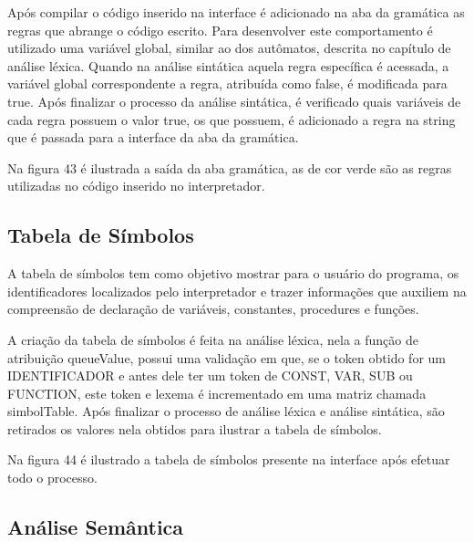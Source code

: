 \documentclass[12pt,oneside,a4paper,chapter=TITLE,section=TITLE,sumario=tradicional]{abntex2}
\begin{document}
Após compilar o código inserido na interface é adicionado na aba da gramática as regras que abrange o código escrito. Para desenvolver este comportamento é utilizado uma variável global, similar ao dos autômatos, descrita no capítulo de análise léxica. Quando na análise sintática aquela regra específica é acessada, a variável global correspondente a regra, atribuída como false, é modificada para true. Após finalizar o processo da análise sintática, é verificado quais variáveis de cada regra possuem o valor true, os que possuem, é adicionado a regra na string que é passada para a interface da aba da gramática. 

Na figura 43 é ilustrada a saída da aba gramática, as de cor verde são as regras utilizadas no código inserido no interpretador. 

\begin{figure}[htb]
\end{figure} 

\subsection{Tabela de Símbolos}
\label{subsec:tabeladesimbolos}

A tabela de símbolos tem como objetivo mostrar para o usuário do programa, os identificadores localizados pelo interpretador e trazer informações que auxiliem na compreensão de declaração de variáveis, constantes, procedures e funções.

A criação da tabela de símbolos é feita na análise léxica, nela a função de atribuição queueValue, possui uma validação em que, se o token obtido for um IDENTIFICADOR e antes dele ter um token de CONST, VAR, SUB ou FUNCTION, este token e lexema é incrementado em uma matriz chamada simbolTable. Após finalizar o processo de análise léxica e análise sintática, são retirados os valores nela obtidos para ilustrar a tabela de símbolos.

Na figura 44 é ilustrado a tabela de símbolos presente na interface após efetuar todo o processo. 

\begin{figure}[htb]
\end{figure} 

\subsection{Análise Semântica}
\label{subsec:anasemantica}
\end{document}
